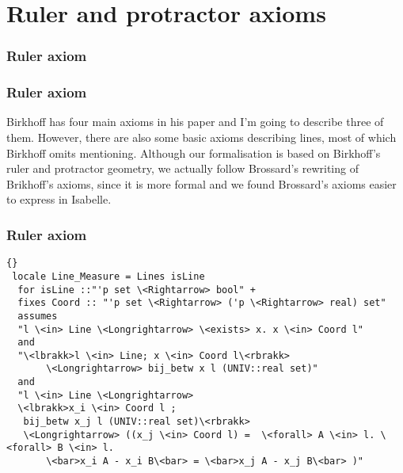 \documentclass{beamer}
\begin{document}
\section{Ruler and protractor axioms}

{\graphicspath{{/Users/Imogen/Desktop/Birkhoff_Presentation/}}

\begin{frame}
\frametitle{Ruler axiom}

 
\end{frame}
}

\begin{frame}
\frametitle{Ruler axiom}
 Birkhoff has four main axioms in his paper and I'm going to describe three of them. However, there are also some basic axioms describing lines, most of which Birkhoff omits mentioning. Although our formalisation is based on Birkhoff's ruler and protractor geometry, we actually follow Brossard's rewriting of Brikhoff's axioms, since it is more formal and we found Brossard's axioms easier to express in Isabelle. 
 
\end{frame}

\begin{frame}
\frametitle{Ruler axiom}
\begin{lstlisting}[language=Isar, mathescape = true]{}  
 locale Line_Measure = Lines isLine
  for isLine ::"'p set \<Rightarrow> bool" +
  fixes Coord :: "'p set \<Rightarrow> ('p \<Rightarrow> real) set" 
  assumes
  "l \<in> Line \<Longrightarrow> \<exists> x. x \<in> Coord l" 
  and
  "\<lbrakk>l \<in> Line; x \<in> Coord l\<rbrakk> 
       \<Longrightarrow> bij_betw x l (UNIV::real set)"
  and
  "l \<in> Line \<Longrightarrow> 
  \<lbrakk>x_i \<in> Coord l ;
   bij_betw x_j l (UNIV::real set)\<rbrakk>
   \<Longrightarrow> ((x_j \<in> Coord l) =  \<forall> A \<in> l. \<forall> B \<in> l. 
       \<bar>x_i A - x_i B\<bar> = \<bar>x_j A - x_j B\<bar> )"
\end{lstlisting}
 
\end{frame}
\end{document}

